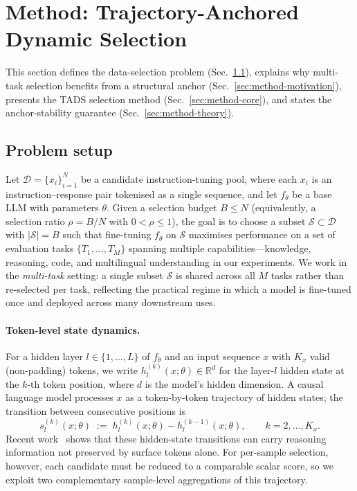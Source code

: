 \section{Method: Trajectory-Anchored Dynamic Selection}
\label{sec:method}

This section defines the data-selection problem
(Sec.~\ref{sec:problem-setup}), explains why multi-task selection
benefits from a structural anchor (Sec.~\ref{sec:method-motivation}),
presents the \textsc{TADS} selection method
(Sec.~\ref{sec:method-core}), and states the anchor-stability
guarantee (Sec.~\ref{sec:method-theory}).

\subsection{Problem setup}
\label{sec:problem-setup}

Let $\mathcal{D} = \{x_i\}_{i=1}^N$ be a candidate instruction-tuning
pool, where each $x_i$ is an instruction--response pair tokenised
as a single sequence, and let $f_\theta$ be a base LLM with
parameters $\theta$. Given a selection budget $B \le N$
(equivalently, a selection ratio $\rho = B/N$ with $0 < \rho \le 1$),
the goal is to choose a subset $\mathcal{S} \subset \mathcal{D}$
with $|\mathcal{S}| = B$ such that fine-tuning $f_\theta$ on
$\mathcal{S}$ maximises performance on a set of evaluation tasks
$\{T_1, \ldots, T_M\}$ spanning multiple capabilities---knowledge,
reasoning, code, and multilingual understanding in our experiments.
We work in the \emph{multi-task} setting: a single subset
$\mathcal{S}$ is shared across all $M$ tasks rather than re-selected
per task, reflecting the practical regime in which a model is
fine-tuned once and deployed across many downstream uses.

\paragraph{Token-level state dynamics.}
For a hidden layer $l \in \{1, \ldots, L\}$ of $f_\theta$ and an
input sequence $x$ with $K_x$ valid (non-padding) tokens, we write
$h_l^{(k)}(x;\theta) \in \mathbb{R}^d$ for the layer-$l$ hidden
state at the $k$-th token position, where $d$ is the model's hidden
dimension. A causal language model processes $x$ as a
token-by-token trajectory of hidden states; the transition between
consecutive positions is
\begin{equation}
  s_l^{(k)}(x;\theta)
  \;:=\;
  h_l^{(k)}(x;\theta) - h_l^{(k-1)}(x;\theta),
  \qquad k = 2, \ldots, K_x .
  \label{eq:transition}
\end{equation}
Recent work~\citep{tang2025sde} shows that these hidden-state
transitions can carry reasoning information not preserved by
surface tokens alone. For per-sample selection, however, each
candidate must be reduced to a comparable scalar score, so we
exploit two complementary sample-level aggregations of this
trajectory.

